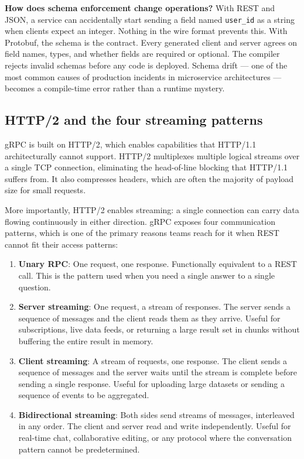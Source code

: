 \documentclass[11pt,a4paper]{article}
\begin{document}
\begin{thinkbox}
\textbf{How does schema enforcement change operations?} With REST and JSON, a service can accidentally start sending a field named \texttt{user\_id} as a string when clients expect an integer. Nothing in the wire format prevents this. With Protobuf, the schema is the contract. Every generated client and server agrees on field names, types, and whether fields are required or optional. The compiler rejects invalid schemas before any code is deployed. Schema drift --- one of the most common causes of production incidents in microservice architectures --- becomes a compile-time error rather than a runtime mystery.
\end{thinkbox}

\subsection{HTTP/2 and the four streaming patterns}

gRPC is built on HTTP/2, which enables capabilities that HTTP/1.1 architecturally cannot support. HTTP/2 multiplexes multiple logical streams over a single TCP connection, eliminating the head-of-line blocking that HTTP/1.1 suffers from. It also compresses headers, which are often the majority of payload size for small requests.

More importantly, HTTP/2 enables streaming: a single connection can carry data flowing continuously in either direction. gRPC exposes four communication patterns, which is one of the primary reasons teams reach for it when REST cannot fit their access patterns:

\begin{enumerate}
  \item \textbf{Unary RPC}: One request, one response. Functionally equivalent to a REST call. This is the pattern used when you need a single answer to a single question.
  \item \textbf{Server streaming}: One request, a stream of responses. The server sends a sequence of messages and the client reads them as they arrive. Useful for subscriptions, live data feeds, or returning a large result set in chunks without buffering the entire result in memory.
  \item \textbf{Client streaming}: A stream of requests, one response. The client sends a sequence of messages and the server waits until the stream is complete before sending a single response. Useful for uploading large datasets or sending a sequence of events to be aggregated.
  \item \textbf{Bidirectional streaming}: Both sides send streams of messages, interleaved in any order. The client and server read and write independently. Useful for real-time chat, collaborative editing, or any protocol where the conversation pattern cannot be predetermined.
\end{enumerate}
\end{document}
